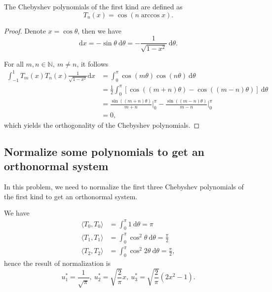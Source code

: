 \documentclass[a4paper]{article}
\begin{document}
The Chebyshev polynomials of the first kind are defined as
\begin{equation}
    T_n(x) = \cos (n \arccos x).
    \label{eq:2_chebyshev_polynomials}
\end{equation}

\begin{proof}
    Denote $x = \cos \theta$, then we have
    \begin{equation}
        \mathrm{d}x = -\sin \theta\ \mathrm{d} \theta = -\frac{1}{\sqrt{1 - x^2}}\ \mathrm{d}\theta.
        \label{eq:2_chebyshev_polynomials_derivative}
    \end{equation}

    For all $m, n \in \mathbb{N},\ m \ne n$, it follows
    \begin{equation}
        \begin{aligned}
            \int_{-1}^1 T_m(x) T_n(x) \frac{1}{\sqrt{1 - x^2}} \mathrm{d}x &= \int_0^{\pi} \cos (m\theta) \cos (n\theta)\ \mathrm{d} \theta \\
            &= \frac{1}{2} \int_0^{\pi} [\cos ((m + n)\theta) - \cos ((m - n)\theta)]\ \mathrm{d} \theta \\
            &= \frac{\sin((m + n)\theta)}{m + n} \Big|_0^{\pi} - \frac{\sin((m - n)\theta)} {m - n} \Big|_0^{\pi} \\
            &= 0,
        \end{aligned}
        \label{eq:2_chebyshev_polynomials_orthogonality}
    \end{equation}
    which yields the orthogonality of the Chebyshev polynomials.
\end{proof}

\subsection{Normalize some polynomials to get an orthonormal system}

In this problem, we need to normalize the first three Chebyshev polynomials of the first kind to get an orthonormal system.

We have 
\begin{equation}
    \begin{aligned}
        \langle T_0, T_0 \rangle &= \int_0^{\pi} 1\ \mathrm{d}\theta = \pi \\
        \langle T_1, T_1 \rangle &= \int_0^{\pi} \cos^2 \theta\ \mathrm{d}\theta = \frac{\pi}{2} \\
        \langle T_2, T_2 \rangle &= \int_0^{\pi} \cos^2 2\theta\ \mathrm{d}\theta = \frac{\pi}{2},
    \end{aligned}
    \label{eq:2_chebyshev_polynomials_norm}
\end{equation}
hence the result of normalization is 
\begin{equation}
    u_1^* = \frac{1}{\sqrt{\pi}},\ u_2^* = \sqrt{\frac{2}{\pi}}x,\ u_3^* = \sqrt{\frac{2}{\pi}}(2x^2 - 1).
    \label{eq:2_chebyshev_polynomials_normalized}
\end{equation}
\end{document}
